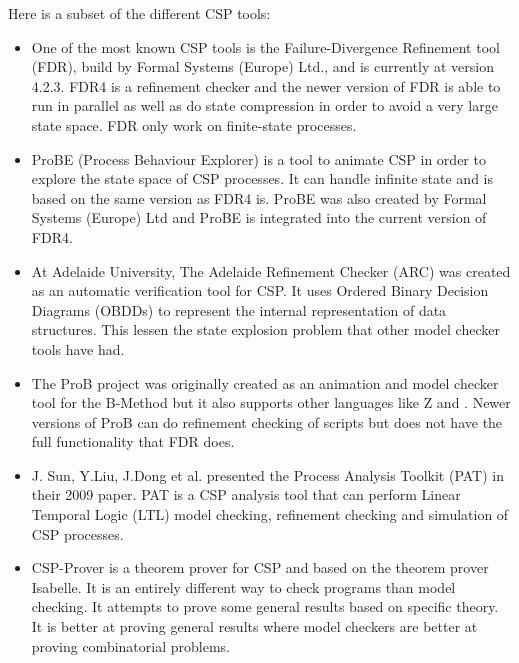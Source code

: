 Here is a subset of the different CSP tools:
\begin{itemize}
\item One of the most known CSP tools is the Failure-Divergence Refinement tool (FDR), build by Formal Systems (Europe) Ltd., and is currently at version 4.2.3\cite{fdr}. FDR4 is a refinement checker and the newer version of FDR is able to run in parallel as well as do state compression in order to avoid a very large state space. FDR only work on finite-state processes.
\item ProBE (Process Behaviour Explorer)\cite{probe} is a tool to animate CSP in order to explore the state space of CSP processes. It can handle infinite state and is based on the same \cspm{} version as FDR4 is. ProBE was also created by Formal Systems (Europe) Ltd and ProBE is integrated into the current version of FDR4.
\item At Adelaide University, The Adelaide Refinement Checker (ARC)\cite{Parashkevov1996} was created as an automatic verification tool for CSP. It uses Ordered Binary Decision Diagrams (OBDDs) to represent the internal representation of data structures. This lessen the state explosion problem that other model checker tools have had. 
\item The ProB project\cite{ProB}\cite{Leuschel2003} was originally created as an animation and model checker tool for the B-Method\cite{Abrial1988} but it also supports other languages like Z and \cspm{}. Newer versions of ProB can do refinement checking of \cspm{} scripts but does not have the full functionality that FDR does. 
\item J. Sun, Y.Liu, J.Dong et al. presented the Process Analysis Toolkit (PAT) in their 2009 paper\cite{Sun2009}. PAT is a CSP analysis tool that can perform Linear Temporal Logic (LTL) model checking, refinement checking and simulation of CSP processes. 
\item CSP-Prover\cite{Isobe2005} is a theorem prover for CSP and based on the theorem prover Isabelle. It is an entirely different way to check programs than model checking. It attempts to prove some general results based on specific theory. It is better at proving general results where model checkers are better at proving combinatorial problems. 
\end{itemize}
